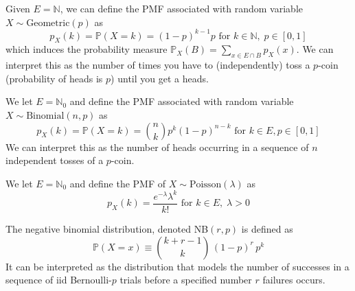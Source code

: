 \documentclass{article}
\begin{document}
      \begin{example}
        Given $E = \mathbb{N}$, we can define the PMF associated with random variable $X \sim \mathrm{Geometric}(p)$ as 
        \begin{equation}
          p_X (k) =\mathbb{P}(X = k) = (1 - p)^{k-1} p \text{ for } k \in \mathbb{N}, \; p \in [0, 1]
        \end{equation}
        which induces the probability measure $\mathbb{P}_X (B) = \sum_{x \in E \cap B} p_X (x)$. We can interpret this as the number of times you have to (independently) toss a $p$-coin (probability of heads is $p$) until you get a heads. 
      \end{example}

      \begin{example}
        We let $E = \mathbb{N}_0$ and define the PMF associated with random variable $X \sim \mathrm{Binomial}(n, p)$ as 
        \begin{equation}
          p_X (k) = \mathbb{P}(X = k) = \binom{n}{k} p^k (1 - p)^{n - k} \text{ for } k \in E, p \in [0, 1]
        \end{equation}
        We can interpret this as the number of heads occurring in a sequence of $n$ independent tosses of a $p$-coin. 
      \end{example}

      \begin{example}
        We let $E = \mathbb{N}_0$ and define the PMF of $X \sim \mathrm{Poisson}(\lambda)$ as 
        \begin{equation}
          p_X (k) = \frac{e^{-\lambda} \lambda^k}{k!} \text{ for } k \in E, \; \lambda > 0
        \end{equation}
      \end{example}

      \begin{definition}
        The negative binomial distribution, denoted NB$(r, p)$ is defined as
        \begin{equation}
          \mathbb{P}(X = x) \equiv \binom{k+r-1}{k} \, (1-p)^r \, p^k
        \end{equation}
        It can be interpreted as the distribution that models the number of successes in a sequence of iid Bernoulli-$p$ trials before a specified number $r$ failures occurs. 
      \end{definition}
\end{document}
